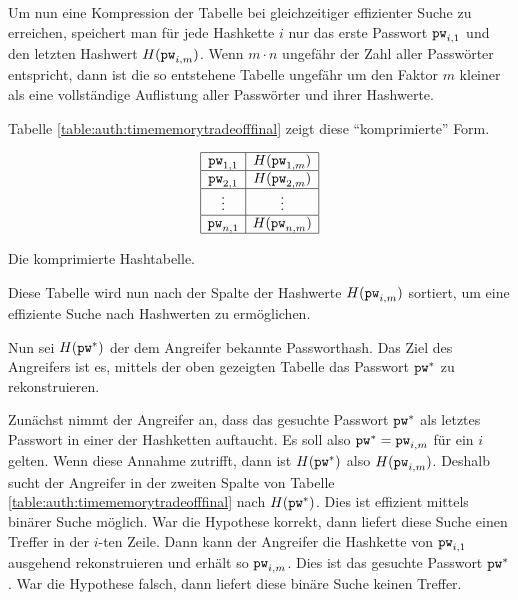 Um nun eine Kompression der Tabelle bei gleichzeitiger effizienter Suche
zu erreichen, speichert man für jede Hashkette $i$ nur das erste
Passwort $\texttt{pw}_{i,1}$ und den letzten Hashwert $H(\texttt{pw}_{i,m})$. Wenn $m
\cdot n$ ungefähr der Zahl aller Passwörter entspricht, dann ist die so
entstehene Tabelle ungefähr um den Faktor $m$ kleiner als eine
vollständige Auflistung aller Passwörter und ihrer Hashwerte.

Tabelle \ref{table:auth:timememorytradeofffinal} zeigt diese "`komprimierte"' Form.
\begin{table}[!h]
	\begin{equation*}
		\begin{array}{|c|c|} \hline \texttt{pw}_{1,1} &
H(\texttt{pw}_{1,m})\\\hline \texttt{pw}_{2,1} & H(\texttt{pw}_{2,m})\\\hline \vdots & \vdots
\\\hline \texttt{pw}_{n,1} & H(\texttt{pw}_{n,m})\\\hline
		\end{array}
	\end{equation*}
	\caption{Die komprimierte Hashtabelle.}
	\label{table:auth:timememorytradeofffinal}
\end{table}

Diese Tabelle wird nun nach der Spalte der Hashwerte $H(\texttt{pw}_{i,m})$
sortiert, um eine effiziente Suche nach Hashwerten zu ermöglichen.

Nun sei $H(\texttt{pw}^*)$ der dem Angreifer bekannte Passworthash. Das Ziel des
Angreifers ist es, mittels der oben gezeigten Tabelle das Passwort
$\texttt{pw}^*$ zu rekonstruieren.

Zunächst nimmt der Angreifer an, dass das gesuchte Passwort $\texttt{pw}^*$ als
letztes Passwort in einer der Hashketten auftaucht.  Es soll also $\texttt{pw}^*
= \texttt{pw}_{i,m}$ für ein $i$ gelten.  Wenn diese Annahme zutrifft, dann ist
$H(\texttt{pw}^*)$ also $H(\texttt{pw}_{i,m})$. Deshalb sucht der Angreifer in der
zweiten Spalte von Tabelle \ref{table:auth:timememorytradeofffinal} nach
$H(\texttt{pw}^*)$. Dies ist effizient mittels binärer Suche möglich.  War die
Hypothese korrekt, dann liefert diese Suche einen Treffer in der $i$-ten
Zeile. Dann kann der Angreifer die Hashkette von $\texttt{pw}_{i,1}$ ausgehend
rekonstruieren und erhält so $\texttt{pw}_{i,m}$. Dies ist das gesuchte Passwort
$\texttt{pw}^*$. War die Hypothese falsch, dann liefert diese binäre Suche
keinen Treffer.


